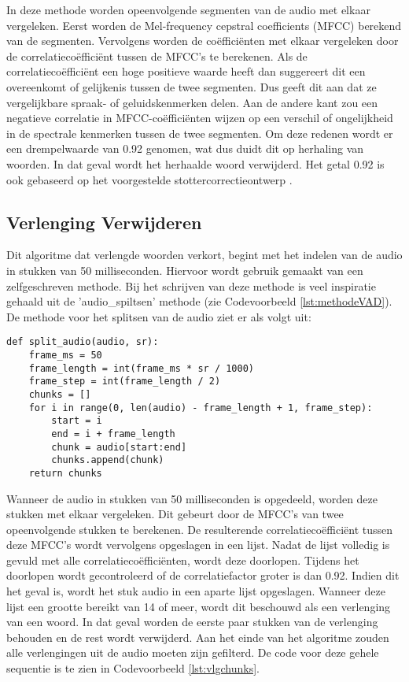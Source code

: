 In deze methode worden opeenvolgende segmenten van de audio met elkaar vergeleken. Eerst worden de Mel-frequency cepstral coefficients (MFCC) berekend van de segmenten. Vervolgens worden de coëfficiënten met elkaar vergeleken door de correlatiecoëfficiënt tussen de MFCC's te berekenen. Als de correlatiecoëfficiënt een hoge positieve waarde heeft dan suggereert dit een overeenkomt of gelijkenis tussen de twee segmenten. Dus geeft dit aan dat ze vergelijkbare spraak- of geluidskenmerken delen. Aan de andere kant zou een negatieve correlatie in MFCC-coëfficiënten wijzen op een verschil of ongelijkheid in de spectrale kenmerken tussen de twee segmenten. Om deze redenen wordt er een drempelwaarde van 0.92 genomen, wat dus duidt dit op herhaling van woorden. In dat geval wordt het herhaalde woord verwijderd. Het getal 0.92 is ook gebaseerd op het voorgestelde stottercorrectieontwerp \autocite{KN2020}.

\subsection{Verlenging Verwijderen}
Dit algoritme dat verlengde woorden verkort, begint met het indelen van de audio in stukken van 50 milliseconden. Hiervoor wordt gebruik gemaakt van een zelfgeschreven methode. Bij het schrijven van deze methode is veel inspiratie gehaald uit de 'audio\_spiltsen' methode (zie Codevoorbeeld \ref{lst:methodeVAD}). De methode voor het splitsen van de audio ziet er als volgt uit:
\begin{listing}[H]
    \begin{verbatim}
def split_audio(audio, sr):
    frame_ms = 50  
    frame_length = int(frame_ms * sr / 1000)  
    frame_step = int(frame_length / 2)  
    chunks = []
    for i in range(0, len(audio) - frame_length + 1, frame_step):
        start = i
        end = i + frame_length
        chunk = audio[start:end]
        chunks.append(chunk)
    return chunks
    \end{verbatim}
    \caption{}
\label{lst:chunks}
\end{listing}
Wanneer de audio in stukken van 50 milliseconden is opgedeeld, worden deze stukken met elkaar vergeleken. Dit gebeurt door de MFCC's van twee opeenvolgende stukken te berekenen. De resulterende correlatiecoëfficiënt tussen deze MFCC's wordt vervolgens opgeslagen in een lijst. Nadat de lijst volledig is gevuld met alle correlatiecoëfficiënten, wordt deze doorlopen. Tijdens het doorlopen wordt gecontroleerd of de correlatiefactor groter is dan 0.92. Indien dit het geval is, wordt het stuk audio in een aparte lijst opgeslagen. Wanneer deze lijst een grootte bereikt van 14 of meer, wordt dit beschouwd als een verlenging van een woord. In dat geval worden de eerste paar stukken van de verlenging behouden en de rest wordt verwijderd. Aan het einde van het algoritme zouden alle verlengingen uit de audio moeten zijn gefilterd. De code voor deze gehele sequentie is te zien in Codevoorbeeld \ref{lst:vlgchunks}.

